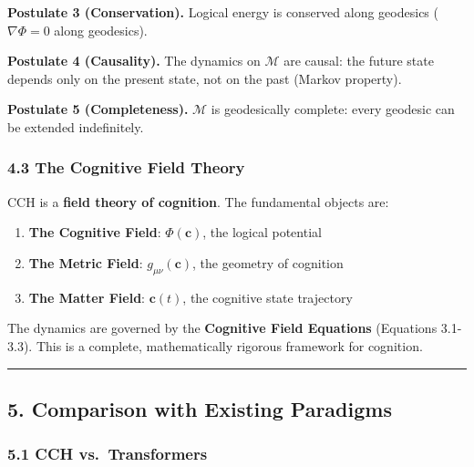 \documentclass[
  11pt,
  a4paper,
]{article}
\providecommand{\tightlist}{%
  \setlength{\itemsep}{0pt}\setlength{\parskip}{0pt}}
\begin{document}
\textbf{Postulate 3 (Conservation).} Logical energy is conserved along
geodesics (\(\nabla \Phi = 0\) along geodesics).

\textbf{Postulate 4 (Causality).} The dynamics on \(\mathcal{M}\) are
causal: the future state depends only on the present state, not on the
past (Markov property).

\textbf{Postulate 5 (Completeness).} \(\mathcal{M}\) is geodesically
complete: every geodesic can be extended indefinitely.

\subsubsection{4.3 The Cognitive Field
Theory}\label{the-cognitive-field-theory}

CCH is a \textbf{field theory of cognition}. The fundamental objects
are:

\begin{enumerate}
\def\labelenumi{\arabic{enumi}.}
\tightlist
\item
  \textbf{The Cognitive Field}: \(\Phi(\mathbf{c})\), the logical
  potential
\item
  \textbf{The Metric Field}: \(g_{\mu\nu}(\mathbf{c})\), the geometry of
  cognition
\item
  \textbf{The Matter Field}: \(\mathbf{c}(t)\), the cognitive state
  trajectory
\end{enumerate}

The dynamics are governed by the \textbf{Cognitive Field Equations}
(Equations 3.1-3.3). This is a complete, mathematically rigorous
framework for cognition.

\begin{center}\rule{0.5\linewidth}{0.5pt}\end{center}

\subsection{5. Comparison with Existing
Paradigms}\label{comparison-with-existing-paradigms}

\subsubsection{5.1 CCH vs.~Transformers}\label{cch-vs.-transformers}
\end{document}
